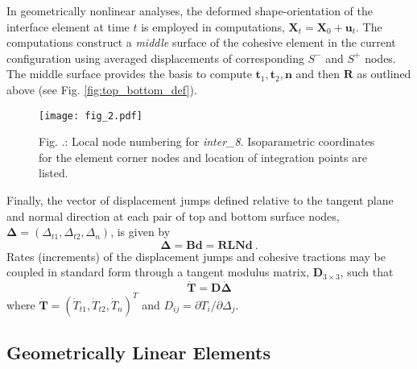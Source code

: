\documentclass[11pt]{report}
\numberwithin{equation}{section}
\newcommand{\bmf } {\boldsymbol }  %
\newcommand{\ti}{\emph}
\renewcommand{\thefigure}{\thesection.\arabic{figure}}
\begin{document}
In geometrically nonlinear analyses, the deformed shape-orientation
of the interface element at time $t$ is employed in computations, 
$\bmf{X}_t= \bmf{X}_0 + \bmf{u}_t$. The computations construct
a \ti{middle} surface of the cohesive element in the current 
configuration using averaged displacements of 
corresponding $S^-$ and $S^+$
nodes. The middle surface provides the basis to compute 
$ \bmf{t}_1, \bmf{t}_2, \bmf{n} $ and then $\bmf{R}$ as outlined above
(see Fig. 
\ref{fig:top_bottom_def}).
%
\begin{figure}[htb]
\begin{center}
\texttt{[image: fig\_2.pdf]} 
\caption{{\small Fig. \thefigure: Local node numbering for \ti{inter\_8}. 
Isoparametric coordinates for the element corner nodes and 
location of integration points are listed.} \label{fig:quad_def}}
%
\end{center}
\end{figure}
%

Finally, the vector of displacement jumps  defined relative to the tangent plane and
normal direction at each pair of top and bottom
surface nodes, 
$\bmf{\Delta}=\left ( \Delta_{t1}, \Delta_{t2}, \Delta_n \right )$,  is given by 
%
\begin {equation}\label{E:B_define}
\bmf{\Delta} = \bmf{B d} = \bmf{R L N d}\ .
\end {equation}%
%
Rates (increments) of the displacement jumps and cohesive tractions may be 
coupled in standard form through a tangent modulus matrix, 
$\bmf{D}_{3 \times 3}$, such that
%
\begin {equation}
\bmf{\dot T} = \bmf{D \dot \Delta}
\end {equation}
%
\noindent where $\bmf{\dot T}= \left(\dot  T_{t1}, \dot T_{t2}, \dot T_n\right )^T$
and $D_{ij}= \partial T_i / \partial \Delta_j$. 

\subsection{Geometrically Linear Elements}
\end{document}
